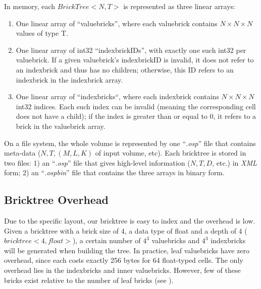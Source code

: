 In memory, each $BrickTree<N,T>$ is represented as three linear arrays:
\begin{enumerate}
\item One linear array of ``valuebricks'', where each valuebrick contains
$N \times N \times N$ values of type T.
\item One linear array of int32 ``indexbrickIDs'', with exactly one such
int32 per valuebrick. If a given valuebrick's indexbrickID is
invalid, it does not refer to an indexbrick and thus has no children;
otherwise, this ID refers to an indexbrick in the indexbrick array.
\item One linear array of ``indexbricks``, where each indexbrick contains
$N \times N \times N$ int32 indices. Each such index can be invalid (meaning the
corresponding cell does not have a child); 
if the index is greater than or equal to 0, it refers to a brick in the valuebrick array.
\end{enumerate}

On a file system, the whole volume is represented by one ``\textit{.osp}'' file
that contains meta-data ($N,T, (M,L,K)$ of input volume, etc). 
Each bricktree is stored in two files: 1) an ``\textit{.osp}'' file that
gives high-level information ($N, T, D$, etc.) in \textit{XML} form; 
2) an ``\textit{.ospbin}'' file that contains the three arrays in binary form.


\subsection{Bricktree Overhead}
Due to the specific layout, our bricktree is easy to index and the overhead is low. 
Given a bricktree with a brick size of 4, a data type of float and a depth of 4 ($bricktree<4,float>$), a certain number of $4^3$ valuebricks and $4^3$ indexbricks will be generated when building the tree.
In practice, leaf valuebricks have zero overhead, since each costs 
exactly 256 bytes for 64 float-typed cells. The only overhead lies in the 
indexbricks and inner valuebricks. However, few of these bricks exist relative
to the number of leaf bricks (see  ).

